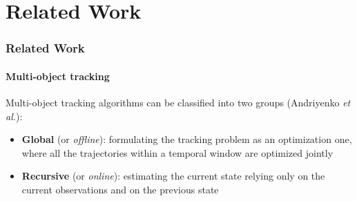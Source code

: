 \section{Related Work}

\begin{frame}
	\frametitle{Related Work}
	\framesubtitle{Multi-object tracking}
	
	\Large
	
	\vspace{0.4cm}
	
	Multi-object tracking algorithms can be classified into two groups (Andriyenko \emph{et al.}):
	
	\vspace{0.2cm}
	
	\begin{itemize}
		\item \textbf{Global} (or \emph{offline}): formulating the tracking problem as an
			  optimization one, where all the trajectories within a temporal window are
			  optimized jointly
		\item \textbf{Recursive} (or \emph{online}): estimating the current state relying
			  only on the current observations and on the previous state
	\end{itemize}
\end{frame}

